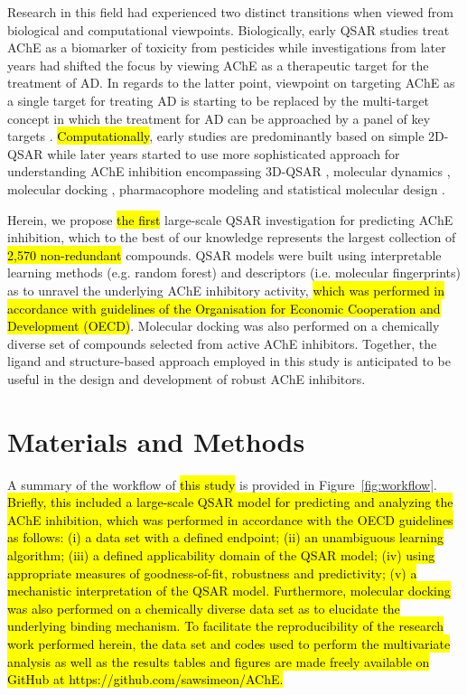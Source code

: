 \documentclass[fleqn,10pt]{wlpeerj}
\begin{document}
Research in this field had experienced two distinct transitions when viewed from biological and computational viewpoints. Biologically, early QSAR studies treat AChE as a biomarker of toxicity from pesticides while investigations from later years had shifted the focus by viewing AChE as a therapeutic target for the treatment of AD. In regards to the latter point, viewpoint on targeting AChE as a single target for treating AD is starting to be replaced by the multi-target concept in which the treatment for AD can be approached by a panel of key targets \citep{fang2015discovery, huang2011searching}. \hl{Computationally}, early studies are predominantly based on simple 2D-QSAR \citep{Mundy1978quantitative, Su1980QSAR} while later years started to use more sophisticated approach for understanding AChE inhibition encompassing 3D-QSAR \citep{Deb2012molecular, lee2016mechanism, prado20123d}, molecular dynamics \citep{shen2002molecular}, molecular docking \citep{lu2011discovery, Deb2012molecular, giacoppo2015molecular}, pharmacophore modeling \cite{lu2011discovery, gupta2014dual} and statistical molecular design \citep{andersson2014benefits, j2013review}.

Herein, we propose \hl{the first} large-scale QSAR investigation for predicting AChE inhibition, which to the best of our knowledge represents the largest collection of \hl{2,570 non-redundant} compounds. QSAR models were built using interpretable learning methods (e.g. random forest) and descriptors (i.e. molecular fingerprints) as to unravel the underlying AChE inhibitory activity, \hl{which was performed in accordance with guidelines of the Organisation for Economic Cooperation and Development (OECD)}. Molecular docking was also performed on a chemically diverse set of compounds selected from active AChE inhibitors. Together, the ligand and structure-based approach employed in this study is anticipated to be useful in the design and development of robust AChE inhibitors.


\section*{Materials and Methods}
A summary of the workflow of \hl{this study} is provided in Figure~\ref{fig:workflow}. \hl{Briefly, this included a large-scale QSAR model for predicting and analyzing the AChE inhibition, which was performed in accordance with the OECD guidelines as follows: (i) a data set with a defined endpoint; (ii) an unambiguous learning algorithm; (iii) a defined applicability domain of the QSAR model; (iv) using appropriate measures of goodness-of-fit, robustness and predictivity; (v) a mechanistic interpretation of the QSAR model. Furthermore, molecular docking was also performed on a chemically diverse data set as to elucidate the underlying binding mechanism. To facilitate the reproducibility of the research work performed herein, the data set and codes used to perform the multivariate analysis as well as the results tables and figures are made freely available on GitHub at https://github.com/sawsimeon/AChE.}
\end{document}
